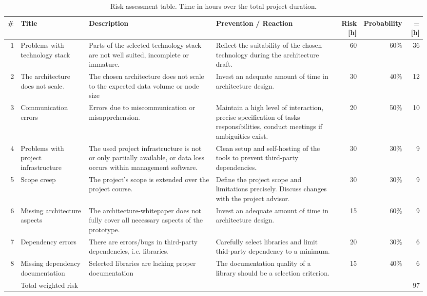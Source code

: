 \begin{table}
	\centering
	\caption[Risk assessment]{Risk assessment table. Time in hours over the total project duration.}
	\label{tbl:project-risks}
	\begin{tabu}{r l X X r r r}
		\hline
		\# & Title & Description & Prevention / Reaction & Risk [h] & Probability & = [h] \\ \hline

		1 & Problems with technology stack
		  & Parts of the selected technology stack are not well suited, incomplete or immature.
		  & Reflect the suitability of the chosen technology during the architecture draft.
		  & 60 & 60\% & 36\\

		2 & The architecture does not scale.
		  & The chosen architecture does not scale to the expected data volume or node size
		  & Invest an adequate amount of time in architecture design.
		  & 30 & 40\% & 12\\

		3 & Communication errors
		  & Errors due to miscommunication or misapprehension.
		  & Maintain a high level of interaction, precise specification of tasks responsibilities, conduct meetings if ambiguities exist.
		  & 20 & 50\% & 10\\

		4 & Problems with project infrastructure
		  & The used project infrastructure is not or only partially available, or data loss occurs within management software.
		  & Clean setup and self-hosting of the tools to prevent third-party dependencies.
		  & 30 & 30\% & 9 \\

		5 & Scope creep
		  & The project's scope is extended over the project course.
		  & Define the project scope and limitations precisely. Discuss changes with the project advisor.
		  & 30 & 30\% & 9\\

		6 & Missing architecture aspects
		  & The architecture-whitepaper does not fully cover all necessary aspects of the prototype.
		  & Invest an adequate amount of time in architecture design.
		  & 15 & 60\% & 9\\

		7 & Dependency errors
		  & There are errors/bugs in third-party dependencies, i.e. libraries.
		  & Carefully select libraries and limit thid-party dependency to a minimum.
		  & 20 & 30\% & 6\\

		8 & Missing dependency documentation
		  & Selected libraries are lacking proper documentation
		  & The documentation quality of a library should be a selection criterion.
		  & 15 & 40\% & 6\\

		 \hline
		& Total weighted risk & & & & & 97\\
		\hline
	\end{tabu}
\end{table}


